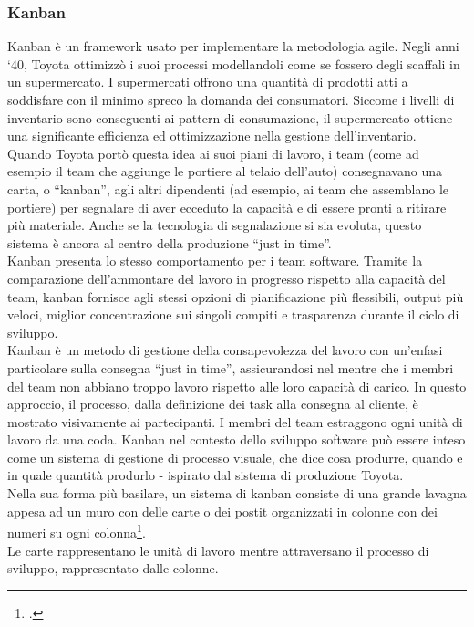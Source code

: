 \subsubsection{Kanban}
Kanban è un framework usato per implementare la metodologia agile. Negli anni ‘40, Toyota ottimizzò i suoi processi modellandoli come se fossero degli scaffali in un supermercato. I supermercati offrono una quantità di prodotti atti a soddisfare con il minimo spreco la domanda dei consumatori. Siccome i livelli di inventario sono conseguenti ai pattern di consumazione, il supermercato ottiene una significante efficienza ed ottimizzazione nella gestione dell’inventario.\\
Quando Toyota portò questa idea ai suoi piani di lavoro, i team (come ad esempio il team che aggiunge le portiere al telaio dell’auto) consegnavano una carta, o “kanban”, agli altri dipendenti (ad esempio, ai team che assemblano le portiere) per segnalare di aver ecceduto la capacità e di essere pronti a ritirare più materiale. Anche se la tecnologia di segnalazione si sia evoluta, questo sistema è ancora al centro della produzione “just in time”.\\
Kanban presenta lo stesso comportamento per i team software. Tramite la comparazione dell’ammontare del lavoro in progresso rispetto alla capacità del team, kanban fornisce agli stessi opzioni di pianificazione più flessibili, output più veloci, miglior concentrazione sui singoli compiti e trasparenza durante il ciclo di sviluppo.\\
Kanban è un metodo di gestione della consapevolezza del lavoro con un’enfasi particolare sulla consegna “just in time”, assicurandosi nel mentre che i membri del team non abbiano troppo lavoro rispetto alle loro capacità di carico. In questo approccio, il processo, dalla definizione dei task alla consegna al cliente, è mostrato visivamente ai partecipanti. I membri del team estraggono ogni unità di lavoro da una coda.
Kanban nel contesto dello sviluppo software può essere inteso come un sistema di gestione di processo visuale, che dice cosa produrre, quando e in quale quantità produrlo - ispirato dal sistema di produzione Toyota.\\
Nella sua forma più basilare, un sistema di kanban consiste di una grande lavagna appesa ad un muro con delle carte o dei postit organizzati in colonne con dei numeri su ogni colonna\footcite{site:kanban}.\\
Le carte rappresentano le unità di lavoro mentre attraversano il processo di sviluppo, rappresentato dalle colonne.\\
